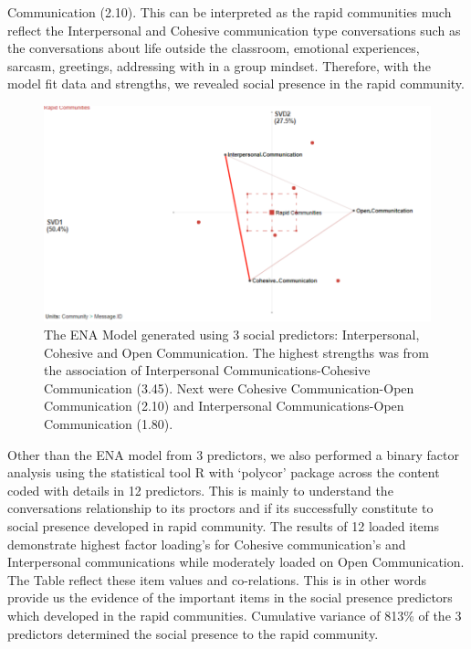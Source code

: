 \documentclass[manuscript,screen,review]{acmart}
\begin{document}
Communication (2.10). This can be interpreted as the rapid communities much reflect the Interpersonal and Cohesive communication type conversations such as the conversations about life outside the classroom, emotional experiences, sarcasm, greetings, addressing with in a group mindset. Therefore, with the model fit data and strengths, we revealed social presence in the rapid community. 
\begin{figure}[h]
  \centering
  \includegraphics[width=\linewidth]{images/ENASocialP.png}
  \caption{The ENA Model generated using 3 social predictors: Interpersonal, Cohesive and Open Communication. The highest  strengths was from the association of Interpersonal Communications-Cohesive Communication (3.45). Next were Cohesive Communication-Open Communication (2.10) and Interpersonal Communications-Open Communication (1.80).   }
 \label{fig:primary}
\end{figure}

Other than the ENA model from 3 predictors, we also performed a binary factor analysis using the statistical tool R with ‘polycor’ package across the content coded with details in 12 predictors. This is mainly to understand the conversations relationship to its proctors and if its successfully constitute to social presence developed in rapid community. The results of 12 loaded items demonstrate highest factor loading's for Cohesive communication's and Interpersonal communications while moderately loaded on Open Communication. The Table reflect these item values and co-relations. This is in other words provide us the evidence of the important items in the social presence predictors which developed in the rapid communities. Cumulative variance of 813\% of the 3 predictors determined the social presence to the rapid community. 
\end{document}
